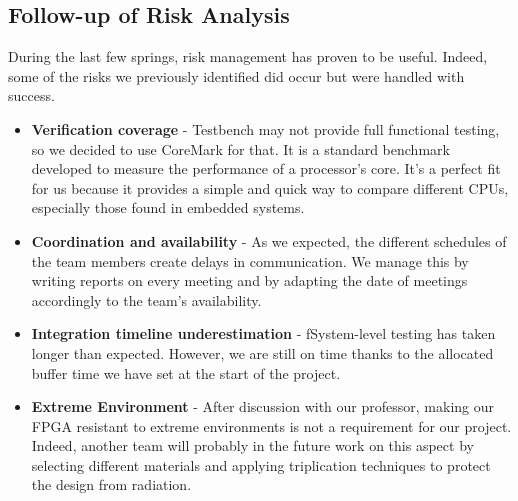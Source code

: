 \documentclass[10pt]{article}
\begin{document}
\subsection{Follow-up of Risk Analysis}
During the last few springs, risk management has proven to be useful. Indeed, some of the risks we previously identified did occur but were handled with success.
\begin{itemize}
    \item \textbf{Verification coverage} - Testbench may not provide full functional testing, so we decided to use CoreMark for that. It is a standard benchmark developed to measure the performance of a processor's core. It’s a perfect fit for us because it provides a simple and quick way to compare different CPUs, especially those found in embedded systems.
    \item \textbf{Coordination and availability} - As we expected, the different schedules of the team members create delays in communication. We manage this by writing reports on every meeting and by adapting the date of meetings accordingly to the team's availability.
    \item \textbf{Integration timeline underestimation} - fSystem-level testing has taken longer than expected. However, we are still on time thanks to the allocated buffer time we have set at the start of the project.
    \item \textbf{Extreme Environment} - After discussion with our professor, making our FPGA resistant to extreme environments is not a requirement for our project. Indeed, another team will probably in the future work on this aspect by selecting different materials and applying triplication techniques to protect the design from radiation.
\end{itemize}
\end{document}
